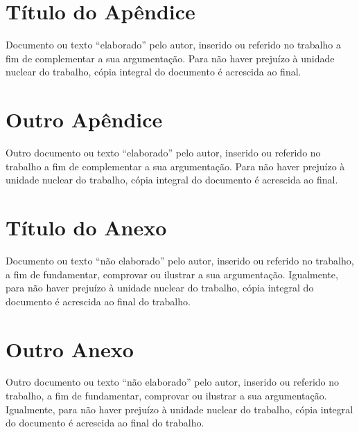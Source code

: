 \documentclass{unemat-tex}
\begin{document}
\begin{apendicesenv}

\partapendices

\chapter{Título do Apêndice}

	Documento ou texto “elaborado” pelo autor, inserido ou referido no trabalho a fim de complementar a sua argumentação. Para	não haver prejuízo à unidade nuclear do	trabalho, cópia integral do documento é	acrescida ao final.
	
\chapter{Outro Apêndice}

	Outro documento ou texto “elaborado” pelo autor, inserido ou referido no trabalho a fim de complementar a sua argumentação. Para	não haver prejuízo à unidade nuclear do	trabalho, cópia integral do documento é	acrescida ao final.


\end{apendicesenv}


\begin{anexosenv}

\partanexos

\chapter{Título do Anexo}

	Documento ou texto “não elaborado”	pelo autor, inserido ou referido no trabalho, a fim de fundamentar, comprovar ou ilustrar a sua argumentação. Igualmente, para não haver prejuízo à unidade nuclear do trabalho, cópia integral do documento é acrescida ao final do trabalho.
	
\chapter{Outro Anexo}

	Outro documento ou texto “não elaborado”	pelo autor, inserido ou referido no trabalho, a fim de fundamentar, comprovar ou ilustrar a sua argumentação. Igualmente, para não haver prejuízo à unidade nuclear do trabalho, cópia integral do documento é acrescida ao final do trabalho.
	
\end{anexosenv}
\end{document}
